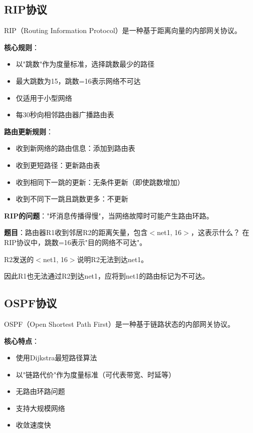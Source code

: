 \documentclass[12pt,a4paper,openany]{ctexbook}
\begin{document}
\subsection{RIP协议}
RIP（Routing Information Protocol）是一种基于距离向量的内部网关协议。

\textbf{核心规则}：
\begin{itemize}[leftmargin=2em,itemsep=0pt]
    \item 以"跳数"作为度量标准，选择跳数最少的路径
    \item 最大跳数为15，跳数=16表示网络不可达
    \item 仅适用于小型网络
    \item 每30秒向相邻路由器广播路由表
\end{itemize}

\textbf{路由更新规则}：
\begin{itemize}[leftmargin=2em,itemsep=0pt]
    \item 收到新网络的路由信息：添加到路由表
    \item 收到更短路径：更新路由表
    \item 收到相同下一跳的更新：无条件更新（即使跳数增加）
    \item 收到不同下一跳且跳数更多：不更新
\end{itemize}

\textbf{RIP的问题}："坏消息传播得慢"，当网络故障时可能产生路由环路。

\begin{examplebox}[例题4.6 RIP协议]
\textbf{题目}：路由器R1收到邻居R2的距离矢量，包含$<$net1, 16$>$，这表示什么？
\tcblower
在RIP协议中，跳数=16表示"目的网络不可达"。

R2发送的$<$net1, 16$>$说明R2无法到达net1。

因此R1也无法通过R2到达net1，应将到net1的路由标记为不可达。
\end{examplebox}

\subsection{OSPF协议}
OSPF（Open Shortest Path First）是一种基于链路状态的内部网关协议。

\textbf{核心特点}：
\begin{itemize}[leftmargin=2em,itemsep=0pt]
    \item 使用Dijkstra最短路径算法
    \item 以"链路代价"作为度量标准（可代表带宽、时延等）
    \item 无路由环路问题
    \item 支持大规模网络
    \item 收敛速度快
\end{itemize}
\end{document}
